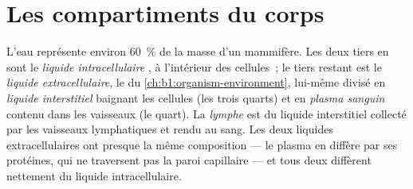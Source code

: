 \section{Les compartiments du corps}

\begin{definition}\label{def:b1:mammal-organization:compartments}
L'eau représente environ \qty{60}{\%} de la masse d'un mammifère. Les
deux tiers en sont le \emph{liquide intracellulaire}
, à l'intérieur des cellules~; le tiers
restant est le
\emph{liquide extracellulaire}, le  du \cref{ch:b1:organism-environment}, lui-même divisé en
\emph{liquide interstitiel} baignant les
cellules (les trois quarts) et en \emph{plasma
sanguin} contenu dans les vaisseaux (le quart). La
\emph{lymphe} est du liquide interstitiel collecté par les
vaisseaux lymphatiques et rendu au sang. Les deux liquides
extracellulaires ont presque la même composition --- le plasma en
diffère par ses protéines, qui ne traversent pas la paroi capillaire ---
et tous deux diffèrent nettement du liquide intracellulaire.
\end{definition}

